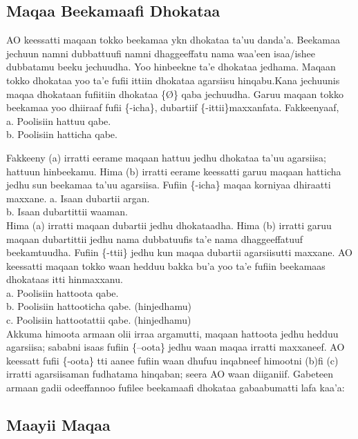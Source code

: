 \documentclass[11pt,b5paper]{book}
\begin{document}
\subsection{Maqaa Beekamaafi Dhokataa}

AO keessatti maqaan tokko beekamaa ykn dhokataa ta'uu danda'a. Beekamaa
jechuun namni dubbattuufi namni dhaggeeffatu nama waa’een isaa/ishee dubbatamu beeku jechuudha. Yoo hinbeekne ta’e dhokataa jedhama. Maqaan tokko dhokataa yoo ta'e fufii ittiin dhokataa agarsiisu hinqabu.Kana jechuunis maqaa dhokataan fufiitiin dhokataa \{Ø\} qaba jechuudha. Garuu maqaan tokko beekamaa yoo dhiiraaf fufii \{-icha\}, dubartiif \{-ittii\}maxxanfata. Fakkeenyaaf,\\
a. Poolisiin hattuu qabe.\\
b. Poolisiin hatticha qabe. 

Fakkeeny (a) irratti eerame maqaan hattuu jedhu dhokataa ta'uu agarsiisa; hattuun hinbeekamu. Hima (b) irratti eerame keessatti garuu maqaan hatticha jedhu sun beekamaa ta'uu agarsiisa. Fufiin \{-icha\} maqaa korniyaa dhiraatti maxxane. 
a. Isaan dubartii argan.\\
b. Isaan dubartittii waaman. \\

Hima (a) irratti maqaan dubartii jedhu dhokataadha. Hima (b) irratti garuu maqaan dubartittii jedhu nama dubbatuufis ta'e nama dhaggeeffatuuf beekamtuudha. Fufiin \{-ttii\} jedhu kun maqaa dubartii agarsiisutti maxxane. AO keessatti maqaan tokko waan hedduu bakka bu'a yoo ta'e fufiin beekamaas dhokataas itti hinmaxxanu.\\
a. Poolisiin hattoota qabe.\\
b. Poolisiin hattooticha qabe. (hinjedhamu)\\
c. Poolisiin hattootattii qabe. (hinjedhamu)\\

Akkuma himoota armaan olii irraa argamutti, maqaan hattoota jedhu hedduu agarsiisa; sababni isaas fufiin \{–oota\} jedhu waan maqaa irratti maxxaneef. AO keessatt fufii \{-oota\} tti aanee fufiin waan dhufuu inqabneef himootni (b)fi (c) irratti agarsiisaman fudhatama hinqaban; seera AO waan diiganiif. Gabeteen armaan gadii odeeffannoo fufilee beekamaafi dhokataa gabaabumatti lafa kaa'a:\\

\subsection{Maayii Maqaa}
\end{document}
